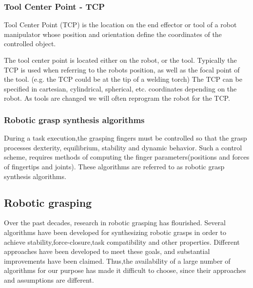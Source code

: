 \subsubsection*{Tool Center Point - TCP}
Tool Center Point (TCP) is the location on the end effector or tool of a robot manipulator whose position and orientation define the coordinates of the controlled object.\par
The tool center point is located either on the robot, or the tool. Typically the TCP is used when referring to the robots position, as well as the focal point of the tool. (e.g. the TCP could be at the tip of a welding torch) The TCP can be specified in cartesian, cylindrical, spherical, etc. coordinates depending on the robot. As tools are changed we will often reprogram the robot for the TCP.
\subsubsection*{Robotic grasp synthesis algorithms}
During a task execution,the grasping fingers must be controlled
so that the grasp processes dexterity, equilibrium, stability and
dynamic behavior. Such a control scheme, requires methods of
computing the finger parameters(positions and forces of fingertips
and joints). These algorithms are referred to as robotic grasp
synthesis algorithms.
\subsection{Robotic grasping}
Over the past decades, research in robotic grasping has flourished. Several algorithms have been developed for synthesizing robotic grasps in order to achieve stability,force-closure,task compatibility and other properties. Different approaches have been developed to meet these goals, and substantial improvements have been claimed. Thus,the availability of a large number of algorithms
for our purpose has made it difficult to choose, since their approaches and assumptions are different.
